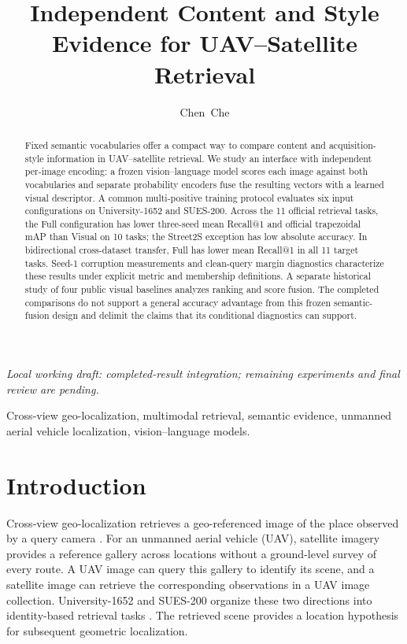 \documentclass[journal]{IEEEtran}
\title{Independent Content and Style Evidence for UAV--Satellite Retrieval}
\author{Chen~Che}
\begin{document}
\maketitle
{}
\begin{center}\footnotesize\itshape
Local working draft: completed-result integration; remaining experiments and final review are pending.
\end{center}

\begin{abstract}
Fixed semantic vocabularies offer a compact way to compare content and
acquisition-style information in UAV--satellite retrieval. We study an
interface with independent per-image encoding: a frozen vision--language model scores
each image against both vocabularies and separate probability encoders fuse
the resulting vectors with a learned visual descriptor. A common
multi-positive training protocol evaluates six input configurations on
University-1652 and SUES-200. Across the 11 official retrieval tasks, the
Full configuration has lower three-seed mean Recall@1 and official
trapezoidal mAP than Visual on 10 tasks; the Street2S exception has low
absolute accuracy. In bidirectional cross-dataset transfer, Full has lower
mean Recall@1 in all 11 target tasks. Seed-1 corruption measurements and
clean-query margin diagnostics characterize these results under explicit
metric and membership definitions. A separate historical study of four
public visual baselines analyzes ranking and score fusion. The completed
comparisons do not support a general accuracy advantage from this frozen
semantic-fusion design and delimit the claims that its conditional
diagnostics can support.
\end{abstract}

\begin{IEEEkeywords}
Cross-view geo-localization, multimodal retrieval, semantic evidence,
unmanned aerial vehicle localization, vision--language models.
\end{IEEEkeywords}

\section{Introduction}
\label{sec:introduction}

Cross-view geo-localization retrieves a geo-referenced image of the place
observed by a query camera \cite{survey2024}. For an unmanned aerial vehicle
(UAV), satellite imagery provides a reference gallery across locations
without a ground-level survey of every route. A UAV image can query this
gallery to identify its scene, and a satellite image can retrieve the
corresponding observations in a UAV image collection. University-1652 and
SUES-200 organize these two directions into identity-based retrieval tasks
\cite{university1652,sues200}. The retrieved scene provides a location
hypothesis for subsequent geometric localization.
\end{document}
